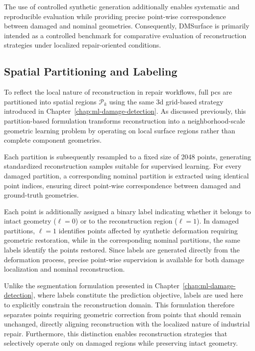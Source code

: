 The use of controlled synthetic generation additionally enables systematic and reproducible evaluation while providing precise point-wise correspondence between damaged and nominal geometries. Consequently, DMSurface is primarily intended as a controlled benchmark for comparative evaluation of reconstruction strategies under localized repair-oriented conditions.

\subsection{Spatial Partitioning and Labeling}

To reflect the local nature of reconstruction in repair workflows, full \acp{pc} are partitioned into spatial regions $\mathcal{P}_{k}$ using the same \ac{3d} grid-based strategy introduced in Chapter~\ref{chap:ml-damage-detection}. As discussed previously, this partition-based formulation transforms reconstruction into a neighborhood-scale geometric learning problem by operating on local surface regions rather than complete component geometries.

Each partition is subsequently resampled to a fixed size of 2048 points, generating standardized reconstruction samples suitable for supervised learning. For every damaged partition, a corresponding nominal partition is extracted using identical point indices, ensuring direct point-wise correspondence between damaged and ground-truth geometries.

Each point is additionally assigned a binary label indicating whether it belongs to intact geometry ($\ell=0$) or to the reconstruction region ($\ell=1$). In damaged partitions, $\ell=1$ identifies points affected by synthetic deformation requiring geometric restoration, while in the corresponding nominal partitions, the same labels identify the points restored. Since labels are generated directly from the deformation process, precise point-wise supervision is available for both damage localization and nominal reconstruction.

Unlike the segmentation formulation presented in Chapter~\ref{chap:ml-damage-detection}, where labels constitute the prediction objective, labels are used here to explicitly constrain the reconstruction domain. This formulation therefore separates points requiring geometric correction from points that should remain unchanged, directly aligning reconstruction with the localized nature of industrial repair. Furthermore, this distinction enables reconstruction strategies that selectively operate only on damaged regions while preserving intact geometry.

